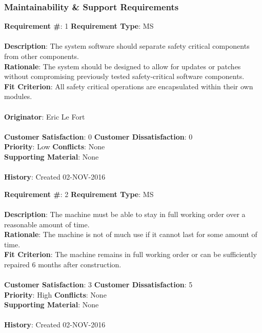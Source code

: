 \documentclass[titlepage]{article}
\begin{document}
\subsubsection{Maintainability \& Support Requirements}
\begin{framed}
	\noindent\textbf{Requirement \#}: 1 \hfill \textbf{Requirement Type}: MS \hfill\\\\
	\noindent\textbf{Description}: The system software should separate safety critical components from other components.\\
	\textbf{Rationale}: The system should be designed to allow for updates or patches without compromising previously tested safety-critical software components.\\
	\textbf{Fit Criterion}: All safety critical operations are encapsulated within their own modules.\\\\
	\textbf{Originator}: Eric Le Fort\\\\
	\noindent\textbf{Customer Satisfaction}: 0 \hfill 	\textbf{Customer Dissatisfaction}: 0\hfill\\
	\textbf{Priority}: Low \hfill \textbf{Conflicts}: None\hfill\\
	\textbf{Supporting Material}: None\\\\
	\noindent\textbf{History}: Created 02-NOV-2016
\end{framed}

\begin{framed}
	\noindent\textbf{Requirement \#}: 2 \hfill \textbf{Requirement Type}: MS \hfill\\\\
	\noindent\textbf{Description}: The machine must be able to stay in full working order over a reasonable amount of time.\\
	\textbf{Rationale}: The machine is not of much use if it cannot last for some amount of time.\\
	\textbf{Fit Criterion}: The machine remains in full working order or can be sufficiently repaired 6 months after construction.\\\\
	\noindent\textbf{Customer Satisfaction}: 3 \hfill 	\textbf{Customer Dissatisfaction}: 5\hfill\\
	\textbf{Priority}: High \hfill \textbf{Conflicts}: None\hfill\\
	\textbf{Supporting Material}: None\\\\
	\noindent\textbf{History}: Created 02-NOV-2016
\end{framed}
\newpage
\end{document}
